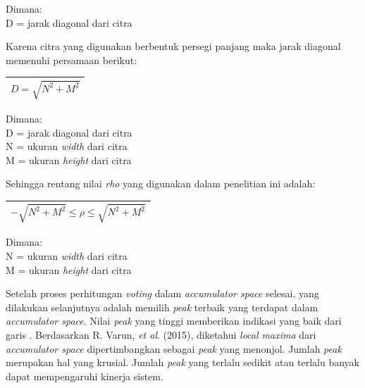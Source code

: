 \noindent Dimana:\\
D = jarak diagonal dari citra

\noindent Karena citra yang digunakan berbentuk persegi panjang maka jarak diagonal memenuhi persamaan berikut:

\begin{table}[H]
	\begin{adjustbox}{width=1\textwidth}
		\begin{tabular}{|p{13.55cm}|}
			\hline
			\begin{equation}
			D = \sqrt{N^2 + M^2}
			\end{equation}\\
			\hline
		\end{tabular}
	\end{adjustbox}
\end{table}

\noindent Dimana:\\
D = jarak diagonal dari citra\\
N = ukuran \textit{width} dari citra\\
M = ukuran \textit{height} dari citra

\noindent Sehingga rentang nilai \textit{rho} yang digunakan dalam penelitian ini adalah:

\begin{table}[H]
	\begin{adjustbox}{width=1\textwidth}
		\begin{tabular}{|p{13.55cm}|}
			\hline
			\begin{equation}
			-\sqrt{N^2 + M^2} \leq \rho \leq \sqrt{N^2 + M^2}
			\end{equation}\\
			\hline
		\end{tabular}
	\end{adjustbox}
\end{table}

\noindent Dimana:\\
N = ukuran \textit{width} dari citra\\
M = ukuran \textit{height} dari citra

\noindent Setelah proses perhitungan \textit{voting} dalam \textit{accumulator space} selesai, yang dilakukan selanjutnya adalah memilih \textit{peak} terbaik yang terdapat dalam \textit{accumulator space}. Nilai \textit{peak} yang tinggi memberikan indikasi yang baik dari garis \cite{oechsle}. Berdasarkan R. Varun, \textit{et al}. (2015), diketahui \textit{local maxima} dari \textit{accumulator space} dipertimbangkan sebagai \textit{peak} yang menonjol. Jumlah \textit{peak} merupakan hal yang krusial. Jumlah \textit{peak} yang terlalu sedikit atau terlalu banyak dapat mempengaruhi kinerja sistem.

